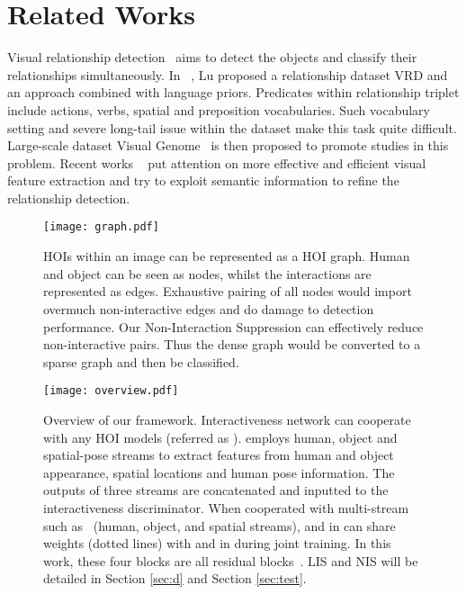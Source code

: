 \documentclass[10pt,twocolumn,letterpaper]{article}
\begin{document}
\section{Related Works}

 Visual relationship detection~\cite{Sadeghi2012Recognition,Lu2016Visual,visualgenome,Yatskar2016Situation} aims to detect the objects and classify their relationships simultaneously. In ~\cite{Lu2016Visual}, Lu \etal proposed a relationship dataset VRD and an approach combined with language priors. Predicates within relationship triplet  include actions, verbs, spatial and preposition vocabularies. Such vocabulary setting and severe long-tail issue within the dataset make this task quite difficult. Large-scale dataset Visual Genome~\cite{visualgenome} is then proposed to promote studies in this problem. Recent works ~\cite{xu2017scene,vtranse,yin2018zoom,yang2018graph} put attention on more effective and efficient visual feature extraction and try to exploit semantic information to refine the relationship detection.
\begin{figure}[!ht]
	\begin{center}
		\texttt{[image: graph.pdf]}
	\end{center}
	\caption{HOIs within an image can be represented as a HOI graph. Human and object can be seen as nodes, whilst the interactions are represented as edges. Exhaustive pairing of all nodes would import overmuch non-interactive edges and do damage to detection performance. Our Non-Interaction Suppression can effectively reduce non-interactive pairs. Thus the dense graph would be converted to a sparse graph and then be classified.}
	\label{Figure:graph-refine}
	\vspace{-0.3cm}
\end{figure}
\begin{figure*}[!ht]
	\begin{center}
		\texttt{[image: overview.pdf]}
	\end{center}
	\caption{Overview of our framework. Interactiveness network  can cooperate with any HOI models (referred as ).  employs human, object and spatial-pose streams to extract features from human and object appearance, spatial locations and human pose information. The outputs of three streams are concatenated and inputted to the interactiveness discriminator. 
	When cooperated with multi-stream  such as~\cite{hicodet,gao2018ican} (human, object, and spatial streams),
	 and  in  can share weights (dotted lines) with  and  in  during joint training. In this work, these four blocks are all residual blocks~\cite{resnet}.
	LIS and NIS will be detailed in Section \ref{sec:d} and Section \ref{sec:test}.}
	\label{Figure:overview}
\end{figure*}
\end{document}
